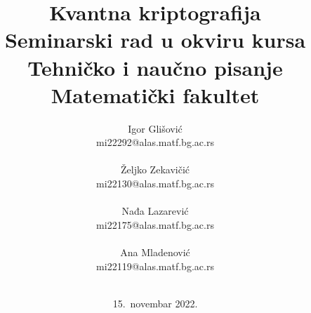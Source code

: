 \documentclass[a4paper]{article}
\begin{document}
\title{Kvantna kriptografija\\ \small{Seminarski rad u okviru kursa\\Tehničko i naučno pisanje\\ Matematički fakultet}}

\author{Igor Glišović\\mi22292@alas.matf.bg.ac.rs\\\\ Željko Zekavičić\\mi22130@alas.matf.bg.ac.rs\\\\ Nađa Lazarević\\mi22175@alas.matf.bg.ac.rs\\\\ Ana Mladenović\\mi22119@alas.matf.bg.ac.rs\\\\}
\date{15.~novembar 2022.}
\maketitle
\end{document}
